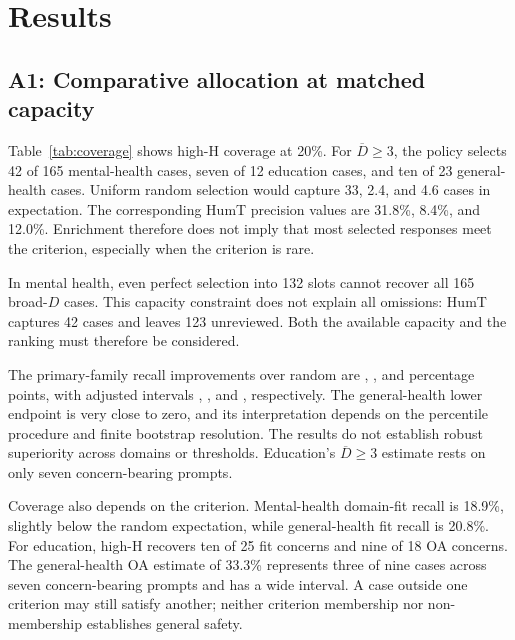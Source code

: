 \documentclass[manuscript,screen,review,anonymous]{acmart}
\newcommand{\Dcrit}{\ensuremath{\overline{D}\geq 3}}
\begin{document}
\section{Results}
\subsection{A1: Comparative allocation at matched capacity}
Table~\ref{tab:coverage} shows high-H coverage at 20\%. For \Dcrit{}, the policy selects 42 of 165 mental-health cases, seven of 12 education cases, and ten of 23 general-health cases. Uniform random selection would capture 33, 2.4, and 4.6 cases in expectation. The corresponding HumT precision values are 31.8\%, 8.4\%, and 12.0\%. Enrichment therefore does not imply that most selected responses meet the criterion, especially when the criterion is rare.


In mental health, even perfect selection into 132 slots cannot recover all 165 broad-$D$ cases. This capacity constraint does not explain all omissions: HumT captures 42 cases and leaves 123 unreviewed. Both the available capacity and the ranking must therefore be considered.

The primary-family recall improvements over random are \MHDelta{}, \EDDelta{}, and \GHDelta{} percentage points, with adjusted intervals \MHAdjusted{}, \EDAdjusted{}, and \GHAdjusted{}, respectively. The general-health lower endpoint is very close to zero, and its interpretation depends on the percentile procedure and finite bootstrap resolution. The results do not establish robust superiority across domains or thresholds. Education's \Dcrit{} estimate rests on only seven concern-bearing prompts.

Coverage also depends on the criterion. Mental-health domain-fit recall is 18.9\%, slightly below the random expectation, while general-health fit recall is 20.8\%. For education, high-H recovers ten of 25 fit concerns and nine of 18 OA concerns. The general-health OA estimate of 33.3\% represents three of nine cases across seven concern-bearing prompts and has a wide interval. A case outside one criterion may still satisfy another; neither criterion membership nor non-membership establishes general safety.
\end{document}

